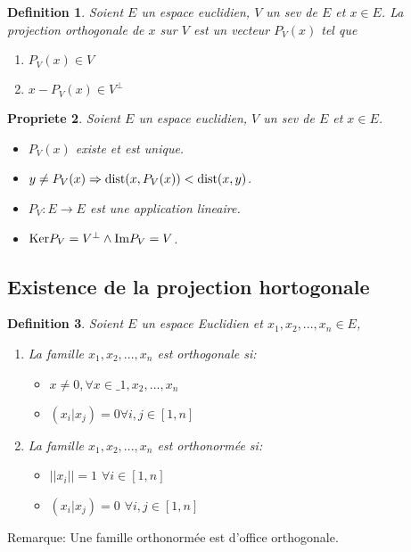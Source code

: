 \documentclass[11pt,a4paper]{article} %
\newtheorem{defin}{Definition}[section]
\newtheorem{prop}[defin]{Propriete}
\begin{document}
\begin{defin}
	Soient $E$ un espace euclidien, $V$ un sev de $E$ et $x \in E$.
	La projection orthogonale de $x$ sur $V$ est un vecteur $P_V(x)$ tel que
	\begin{enumerate}
		\item $P_V(x) \in V$
		\item $x - P_V(x) \in V^{\perp}$
	\end{enumerate}
\end{defin}

\begin{prop}
	Soient $E$ un espace euclidien, $V$ un sev de $E$ et $x \in E$.
	\begin{itemize}
		\item $P_V(x)$ existe et est unique.
		\item $y \neq P_V(x) \Rightarrow \mathrm{dist}(x, P_V(x)) < \mathrm{dist}(x, y)$.
		\item $P_V : E \to E$ est une application lineaire.
		\item $\mathrm{Ker} P_V = V^{\perp} \land \mathrm{Im} P_V = V$.
	\end{itemize}
\end{prop}


\subsection{Existence de la projection hortogonale}
\begin{defin}
  Soient $E$ un espace Euclidien et $x_1, x_2,... ,x_n \in E$,
  \begin{enumerate}
  \item La famille $x_1, x_2,... ,x_n$ est orthogonale si:
    \begin{itemize}
    \item $x \neq 0, \forall x \in \_1,x_2,...,x_n$
    \item $(x_i|x_j) = 0 \forall i, j \in [1, n]$
    \end{itemize}

  \item La famille $x_1, x_2,... ,x_n$ est orthonormée si:
    \begin{itemize}
    \item $||x_i|| = 1$ $\forall i \in [1, n]$
    \item $(x_i|x_j) = 0$ $\forall i, j \in [1, n]$ %
    \end{itemize}
  \end{enumerate}
\end{defin}
Remarque: Une famille orthonormée est d'office orthogonale.
\end{document}
